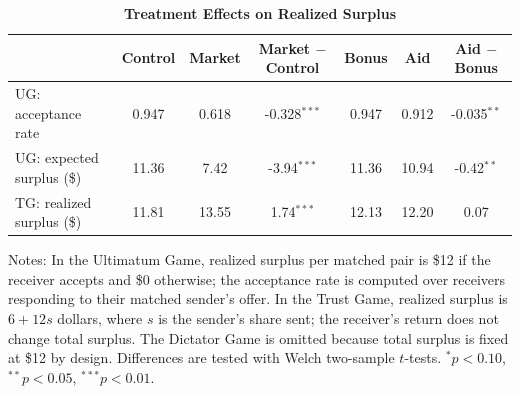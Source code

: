 \begin{table}[!htbp]
\centering
\caption{\textbf{Treatment Effects on Realized Surplus}}
\label{tab:surplus_by_treatment}
\begin{tabular}{lcccccc}
\toprule
 & Control & Market & Market $-$ Control & Bonus & Aid & Aid $-$ Bonus \\
\midrule
UG: acceptance rate & 0.947 & 0.618 & -0.328$^{***}$ & 0.947 & 0.912 & -0.035$^{**}$ \\ %
UG: expected surplus (\$) & 11.36 & 7.42 & -3.94$^{***}$ & 11.36 & 10.94 & -0.42$^{**}$ \\ %
TG: realized surplus (\$) & 11.81 & 13.55 & 1.74$^{***}$ & 12.13 & 12.20 & 0.07 \\ %
\bottomrule
\end{tabular}
\begin{flushleft}
\footnotesize Notes: In the Ultimatum Game, realized surplus per matched pair is \$12 if the receiver accepts and \$0 otherwise; the acceptance rate is computed over receivers responding to their matched sender's offer. In the Trust Game, realized surplus is $6+12s$ dollars, where $s$ is the sender's share sent; the receiver's return does not change total surplus. The Dictator Game is omitted because total surplus is fixed at \$12 by design. Differences are tested with Welch two-sample $t$-tests. $^{*}p<0.10$, $^{**}p<0.05$, $^{***}p<0.01$.
\end{flushleft}
\end{table}
